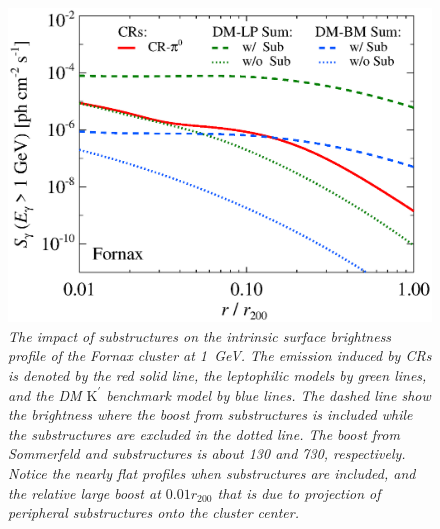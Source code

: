 \documentclass[10pt,aps,pra,reprint,amsmath,amsfonts,amssymb,showpacs,nofootinbib,floatfix]{revtex4-1}
\newcommand{\rmn}{\mathrm}
\newcommand{\Kp}{\rmn{K}^\prime}
\newcommand{\rvir}{r_{200}}
\begin{document}
\begin{figure}%
 \includegraphics[width=0.99\columnwidth]{figures/SB.resolved.v12.1GeV.SF300.noSuB.vs.SubMass.elmu.eps}
 \caption{\it The impact of substructures on the intrinsic surface
   brightness profile of the Fornax cluster at 1~GeV. The emission
   induced by CRs is denoted by the red solid line, the leptophilic
   models by green lines, and the DM $\Kp$ benchmark model by blue
   lines. The dashed line show the brightness where the boost from
   substructures is included while the substructures are excluded in
   the dotted line. The boost from Sommerfeld and substructures is
   about 130 and 730, respectively. Notice the nearly flat profiles
   when substructures are included, and the relative large boost at
   $0.01\rvir$ that is due to projection of peripheral substructures
   onto the cluster center.}
 \label{fig:SB_sub}
\end{figure}
\end{document}

